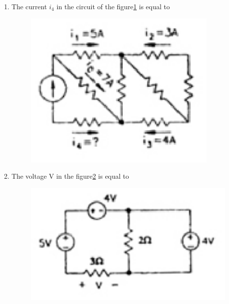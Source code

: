 \documentclass[journal,12pt,twocolumn]{IEEEtran}
\begin{document}
\begin{enumerate}
                   
              
\item The current $i_{4}$ in the circuit of the figure\ref{fig11} is equal to
\begin{enumerate}
\setlength\itemsep{2em}
\begin{figure}[!h]
\begin{center}
\includegraphics[scale=0.7]{./figs/fig11.eps}
\caption{}
\label{fig11}
\end{center}
\end{figure}
\end{enumerate}
       
       
\item The voltage V in the figure\ref{fig12} is equal to
\begin{enumerate}
\setlength\itemsep{2em}
\begin{figure}[!h]
\begin{center}
\includegraphics[scale=0.7]{./figs/fig12.eps}
\caption{}
\label{fig12}
\end{center}
\end{figure}
\end{enumerate}



\end{enumerate}
\end{document}
